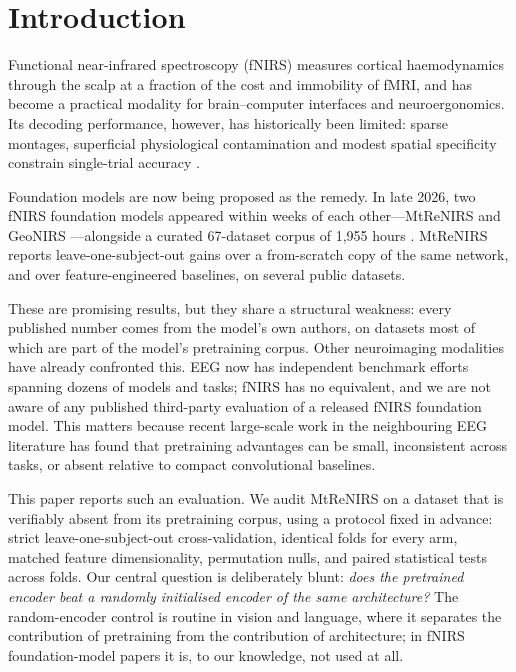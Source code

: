 \section{Introduction}
\label{sec:intro}

Functional near-infrared spectroscopy (fNIRS) measures cortical haemodynamics through the scalp
at a fraction of the cost and immobility of fMRI, and has become a practical modality for
brain--computer interfaces and neuroergonomics. Its decoding performance, however, has
historically been limited: sparse montages, superficial physiological contamination and modest
spatial specificity constrain single-trial accuracy \citep{fischer2026density}.

Foundation models are now being proposed as the remedy. In late 2026, two fNIRS foundation
models appeared within weeks of each other---MtReNIRS \citep{chae2026mtrenirs} and GeoNIRS
\citep{geonirs2026}---alongside a curated 67-dataset corpus of 1{,}955 hours
\citep{sposso2026corpus}. MtReNIRS reports leave-one-subject-out gains over a from-scratch copy
of the same network, and over feature-engineered baselines, on several public datasets.

These are promising results, but they share a structural weakness: every published number comes
from the model's own authors, on datasets most of which are part of the model's pretraining
corpus. Other neuroimaging modalities have already confronted this. EEG now has independent
benchmark efforts spanning dozens of models and tasks; fNIRS has no equivalent, and we are not
aware of any published third-party evaluation of a released fNIRS foundation model. This matters
because recent large-scale work in the neighbouring EEG literature has found that pretraining
advantages can be small, inconsistent across tasks, or absent relative to compact
convolutional baselines.

This paper reports such an evaluation. We audit MtReNIRS on a dataset that is verifiably absent
from its pretraining corpus, using a protocol fixed in advance: strict leave-one-subject-out
cross-validation, identical folds for every arm, matched feature dimensionality, permutation
nulls, and paired statistical tests across folds. Our central question is deliberately blunt:
\emph{does the pretrained encoder beat a randomly initialised encoder of the same architecture?}
The random-encoder control is routine in vision and language, where it separates the
contribution of pretraining from the contribution of architecture; in fNIRS foundation-model
papers it is, to our knowledge, not used at all.

